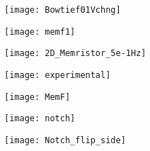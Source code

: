 \begin{doublespace}
\begin{figure}[!htp]
\centering
\texttt{[image: Bowtief01Vchng]}
\caption{} 
\label{}
\end{figure}


\begin{figure}[!htp]
\centering
\texttt{[image: memf1]}
\caption{} 
\label{}
\end{figure}


\begin{figure}[!htp]
\centering
\texttt{[image: 2D\_Memristor\_5e-1Hz]}
\caption{} 
\label{}
\end{figure}


\begin{figure}[!htp]
\centering
\texttt{[image: experimental]}
\caption{} 
\label{}
\end{figure}

\begin{figure}[!htp]
\centering
\texttt{[image: MemF]}
\caption{} 
\label{}
\end{figure}

\begin{figure}[!htp]
\centering
\texttt{[image: notch]}
\caption{} 
\label{}
\end{figure}

\begin{figure}[!htp]
\centering
\texttt{[image: Notch\_flip\_side]}
\caption{} 
\label{}
\end{figure}


\end{doublespace}

